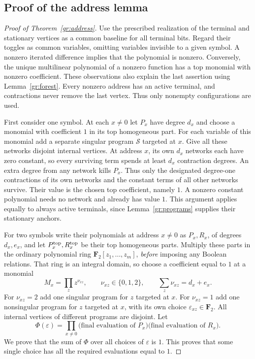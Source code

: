 \subsection{Proof of the address lemma}

\begin{proof}[Proof of Theorem~\ref{gr:address}]
Use the prescribed realization of the terminal and stationary vertices
as a common baseline for all terminal bits.  Regard
their toggles as common variables, omitting variables invisible to a
given symbol.  A nonzero iterated difference implies that the polynomial
is nonzero.  Conversely, the unique multilinear polynomial of a
nonzero function has a top monomial with nonzero coefficient.  These
observations also explain the last assertion using
Lemma~\ref{gr:forest}.
Every nonzero address has an active terminal, and contractions never
remove the last vertex.  Thus only nonempty configurations are used.

First consider one symbol.  At each $x\ne0$ let $P_x$ have degree $d_x$
and choose a monomial with coefficient $1$ in its top homogeneous part.
For each variable of this monomial add a separate singular program
$\mathcal S$ targeted at $x$.  Give all these networks disjoint internal
vertices.  At address $x$, its own $d_x$ networks each have zero constant,
so every surviving term spends at least $d_x$ contraction degrees.
An extra degree from any network kills $P_x$.  Thus only the designated
degree-one contractions of its own networks and the constant terms
of all other networks survive.  Their value is the chosen top
coefficient, namely $1$.  A nonzero constant polynomial needs no
network and already has value $1$.  This argument applies equally to
always active terminals, since Lemma~\ref{gr:programs} supplies their
stationary anchors.

For two symbols write their polynomials at address $x\ne0$ as
$P_x,R_x$, of degrees $d_x,e_x$, and let $P_x^{\rm top},R_x^{\rm top}$
be their top homogeneous parts.  Multiply these parts in the ordinary
polynomial ring
$\mathbf F_2[z_1,\ldots,z_m]$, \emph{before} imposing any Boolean
relations.  That ring is an integral domain, so choose a coefficient
equal to $1$ at a monomial
\begin{equation}\label{gr:chosen-monomial}
 M_x=\prod_z z^{\nu_{xz}},\qquad
 \nu_{xz}\in\{0,1,2\},\qquad
 \sum_z\nu_{xz}=d_x+e_x.
\end{equation}
For $\nu_{xz}=2$ add one singular program for $z$ targeted at $x$.
For $\nu_{xz}=1$ add one nonsingular program for $z$ targeted at $x$,
with its own choice $\varepsilon_{xz}\in\mathbf F_2$.  All internal
vertices of different programs are disjoint.  Let
\[
 \Phi(\varepsilon)=\prod_{x\ne0}
       \bigl(\text{final evaluation of }P_x\bigr)
       \bigl(\text{final evaluation of }R_x\bigr).
\]
We prove that the sum of $\Phi$ over all choices of $\varepsilon$ is $1$.
This proves that some single choice has all the required evaluations
equal to $1$.


\end{proof}
